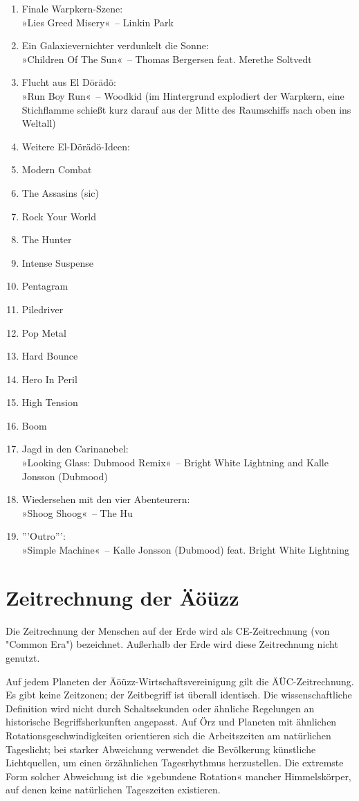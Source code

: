 \begin{enumerate}
    \item Finale Warpkern-Szene:\\ »Lies Greed Misery«~– Linkin Park
    \item Ein Galaxievernichter verdunkelt die Sonne:\\ »Children Of The Sun«~– Thomas Bergersen feat. Merethe Soltvedt
    \item Flucht aus El Dörädö:\\ »Run Boy Run«~– Woodkid                                      (im Hintergrund explodiert der Warpkern, eine Stichflamme schießt kurz darauf aus der Mitte des Raumschiffs nach oben ins Weltall)
    \item Weitere El-Dörädö-Ideen:
    \item Modern Combat
    \item The Assasins (sic)
    \item Rock Your World
    \item The Hunter
    \item Intense Suspense
    \item Pentagram
    \item Piledriver
    \item Pop Metal
    \item Hard Bounce
    \item Hero In Peril
    \item High Tension
    \item Boom
    \item Jagd in den Carinanebel:\\ »Looking Glass: Dubmood Remix«~– Bright White Lightning and Kalle Jonsson (Dubmood)
    \item Wiedersehen mit den vier Abenteurern:\\ »Shoog Shoog«~– The Hu
    \item '''Outro''':\\ »Simple Machine«~– Kalle Jonsson (Dubmood) feat. Bright White Lightning
\end{enumerate}

\chapter{Zeitrechnung der Äöüzz}

Die Zeitrechnung der Menschen auf der Erde wird als CE-Zeitrechnung (von "Common Era") bezeichnet. Außerhalb der Erde wird diese Zeitrechnung nicht genutzt.

Auf jedem Planeten der Äöüzz-Wirtschaftsvereinigung gilt die ÄÜC-Zeitrechnung. Es gibt keine Zeitzonen; der Zeitbegriff ist überall identisch. Die wissenschaftliche Definition wird nicht durch Schaltsekunden oder ähnliche Regelungen an historische Begriffsherkunften angepasst. Auf Örz und Planeten mit ähnlichen Rotationsgeschwindigkeiten orientieren sich die Arbeitszeiten am natürlichen Tageslicht; bei starker Abweichung verwendet die Bevölkerung künstliche Lichtquellen, um einen örzähnlichen Tagesrhythmus herzustellen. Die extremste Form solcher Abweichung ist die »gebundene Rotation« mancher Himmelskörper, auf denen keine natürlichen Tageszeiten existieren.

